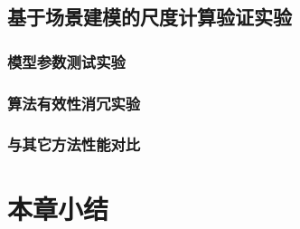 \subsection{基于场景建模的尺度计算验证实验} 
\subsubsection{模型参数测试实验}
\subsubsection{算法有效性消冗实验}
\subsubsection{与其它方法性能对比}
\section{本章小结}